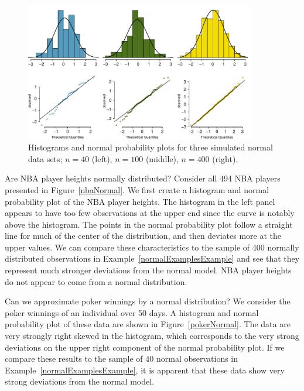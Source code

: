 \begin{figure}
\centering
\includegraphics[width=0.9\textwidth]{ch_distributions/figures/normalExamples/normalExamples}
\caption{Histograms and normal probability plots for three simulated normal data sets; $n=40$ (left), $n=100$ (middle), $n=400$ (right).}
\label{normalExamples}
\end{figure}

\begin{examplewrap}
\begin{nexample}{Are NBA player heights normally distributed?
    Consider all 494 NBA players presented in
    Figure~\ref{nbaNormal}.}
  We first create a histogram and normal probability plot
  of the NBA player heights.
  The histogram in the left panel appears to have too few
  observations at the upper end since the curve is notably
  above the histogram.
  The points in the normal probability plot
  follow a straight line for much of the center of the
  distribution, and then deviates more at the upper values.
  We can compare these characteristics to the sample of
  400 normally distributed observations in
  Example~\ref{normalExamplesExample} and see that they
  represent much stronger deviations from the normal model.
  NBA player heights do not appear to come from a normal
  distribution.
\end{nexample}
\end{examplewrap}

\begin{examplewrap}
\begin{nexample}{Can we approximate poker winnings by a normal distribution? We consider the poker winnings of an individual over 50 days. A histogram and normal probability plot of these data are shown in Figure~\ref{pokerNormal}.}
The data are very strongly right skewed in the histogram, which corresponds to the very strong deviations on the upper right component of the normal probability plot. If we compare these results to the sample of 40 normal observations in Example~\ref{normalExamplesExample}, it is apparent that these data show very strong deviations from the normal model.
\end{nexample}
\end{examplewrap}

